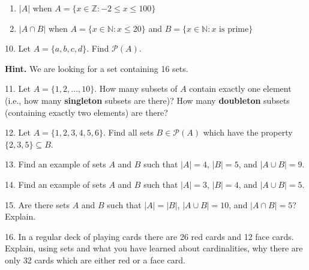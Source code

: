 \documentclass[10pt,]{book}
\newcommand{\terminology}[1]{\textbf{#1}}
\theoremstyle{plain}
\theoremstyle{definition}
\theoremstyle{definition}
\theoremstyle{definition}
\theoremstyle{definition}
\numberwithin{equation}{chapter}
\newcommand{\N}{\mathbb N}
\newcommand{\Z}{\mathbb Z}
\newcommand{\pow}{\mathcal P}
\newcommand{\st}{:}
\begin{document}
\begin{exerciselist}
\begin{enumerate}[label=(\alph*)]
\item\hypertarget{li-320}{}\(|A|\) when \(A = \{x \in \Z \st -2 \le x \le 100\}\)%
\item\hypertarget{li-321}{}\(|A \cap B|\) when \(A = \{x \in \N \st x \le 20\}\) and \(B = \{x \in \N \st x \mbox{ is prime} \}\)%
\end{enumerate}
%
\par\smallskip
\item[10.]\hypertarget{exercise-77}{}\hypertarget{p-661}{}%
Let \(A = \{a, b, c, d\}\). Find \(\pow(A)\).%
\par\smallskip
\par\smallskip%
\noindent\textbf{Hint.}\hypertarget{hint-3}{}\quad%
\hypertarget{p-662}{}%
We are looking for a set containing 16 sets.%
\item[11.]\hypertarget{exercise-78}{}\hypertarget{p-663}{}%
Let \(A = \{1,2,\ldots, 10\}\). How many subsets of \(A\) contain exactly one element (i.e., how many \terminology{singleton} subsets are there)? How many \terminology{doubleton} subsets (containing exactly two elements) are there?%
\par\smallskip
\item[12.]\hypertarget{exercise-79}{}\hypertarget{p-664}{}%
Let \(A = \{1,2,3,4,5,6\}\). Find all sets \(B \in \pow(A)\) which have the property \(\{2,3,5\} \subseteq B\).%
\par\smallskip
\item[13.]\hypertarget{exercise-80}{}\hypertarget{p-665}{}%
Find an example of sets \(A\) and \(B\) such that \(|A| = 4\), \(|B| = 5\), and \(|A \cup B| = 9\).%
\par\smallskip
\item[14.]\hypertarget{exercise-81}{}\hypertarget{p-667}{}%
Find an example of sets \(A\) and \(B\) such that \(|A| = 3\), \(|B| = 4\), and \(|A \cup B| = 5\).%
\par\smallskip
\item[15.]\hypertarget{exercise-82}{}\hypertarget{p-668}{}%
Are there sets \(A\) and \(B\) such that \(|A| = |B|\), \(|A\cup B| = 10\), and \(|A\cap B| = 5\)? Explain.%
\par\smallskip
\item[16.]\hypertarget{exercise-83}{}\hypertarget{p-669}{}%
In a regular deck of playing cards there are 26 red cards and 12 face cards. Explain, using sets and what you have learned about cardinalities, why there are only 32 cards which are either red or a face card.%
\par\smallskip
\end{exerciselist}
\typeout{************************************************}
\typeout{************************************************}
\end{document}
